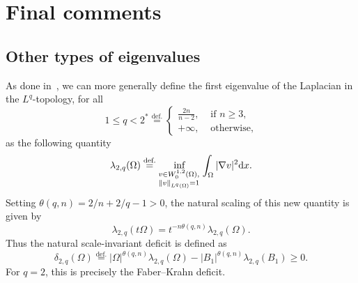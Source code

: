 \documentclass[11pt]{amsart}
\theoremstyle{plain}
\theoremstyle{definition}
\newcommand{\eqdef}{\overset{\text{def.}}{=}}
\def\dd{{\rm d}}
\newcommand{\norm}[1]{\left\lVert#1\right\rVert}
\begin{document}



\section{Final comments}\label{sec.comments}

\subsection{Other types of eigenvalues}\label{sec.generalized_eigenvalues}

As done in~\cite{brasco2015faber}, we can more generally define the first eigenvalue of the Laplacian in the $L^q$-topology, for all
\[
    1 \le q < 2^* 
    \eqdef 
    \begin{cases}
        \frac{2n}{n-2},& \text{ if } n \ge 3, \\ 
        +\infty,& \text{ otherwise,}
    \end{cases}
\]
as the following quantity 
\begin{equation}
     \lambda_{2,q}(\Omega)
      \eqdef
      \inf_{
        \substack{
            v\in W_0^{1,2}(\Omega),\\
            \norm{v}_{L^q(\Omega)} = 1
        } \, 
      }
      \displaystyle
      \int_\Omega |\nabla v|^2\dd x .
\end{equation}
Setting $\theta(q,n)=2/n+2/q-1>0$, the natural scaling of this new quantity is given by 
\[
 \lambda_{2,q}(t\Omega)=t^{-n\theta(q,n)}\lambda_{2,q}(\Omega).
\]
Thus the natural scale-invariant deficit is defined as
\begin{equation}\label{eq.deficit_2q}
 \delta_{2,q}(\Omega)
 \eqdef |\Omega|^{\theta(q,n)}\lambda_{2,q}(\Omega)
 -|B_1|^{\theta(q,n)}\lambda_{2,q}(B_1)\ge0.
\end{equation}
For $q=2$, this is precisely the Faber--Krahn deficit. 
\end{document}
